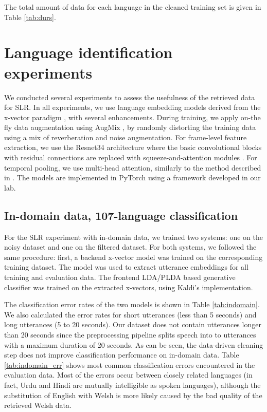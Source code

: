 \documentclass{article}
\begin{document}
The total amount of data for each language in the cleaned training set is given in Table \ref{tab:durs}.






\section{Language identification experiments}

We conducted several experiments to assess the usefulness of the retrieved data for SLR. In all experiments, we use language embedding models derived from the x-vector paradigm \cite{snyder2018x,snyder2018spoken}, with several enhancements. During training, we apply on-the fly data augmentation using AugMix \cite{hendrycks2019augmix}, by randomly distorting the training data using a mix of reverberation and noise augmentation. For frame-level feature extraction, we use the Resnet34 \cite{cai2018exploring, he2016deep} architecture where the basic convolutional blocks with residual connections are replaced with squeeze-and-attention modules \cite{hu2018squeeze,zhou2019deep}.
For temporal pooling, we use multi-head attention, similarly to the method described in \cite{zhu2018self}. The models are implemented in PyTorch \cite{NEURIPS2019_9015} using a framework developed in our lab.


\subsection{In-domain data, 107-language classification}

For the SLR experiment with in-domain data, we trained two systems: one on the noisy dataset and one on the filtered dataset. For both systems, we followed the same procedure: first, a backend x-vector model was trained on the corresponding training dataset. The model was used to extract utterance embeddings for all training and evaluation data. The frontend LDA/PLDA based generative classifier was trained on the extracted x-vectors, using Kaldi's \cite{kaldi} implementation. 

The classification error rates of the two models is shown in Table \ref{tab:indomain}. We also calculated the error rates for short utterances (less than 5 seconds) and long utterances (5 to 20 seconds). Our dataset does not contain utterances longer than 20 seconds  since the preprocessing pipeline splits speech into to utterances with a maximum duration of 20 seconds.
As can be seen, the data-driven cleaning step does not improve classification performance on in-domain data. Table \ref{tab:indomain_err} shows most common classification errors encountered in the evaluation data. Most of the errors occur between closely related languages (in fact, Urdu and Hindi are mutually intelligible as spoken languages), although the substitution of English with Welsh is more likely caused by the bad quality of the retrieved Welsh data.
\end{document}
